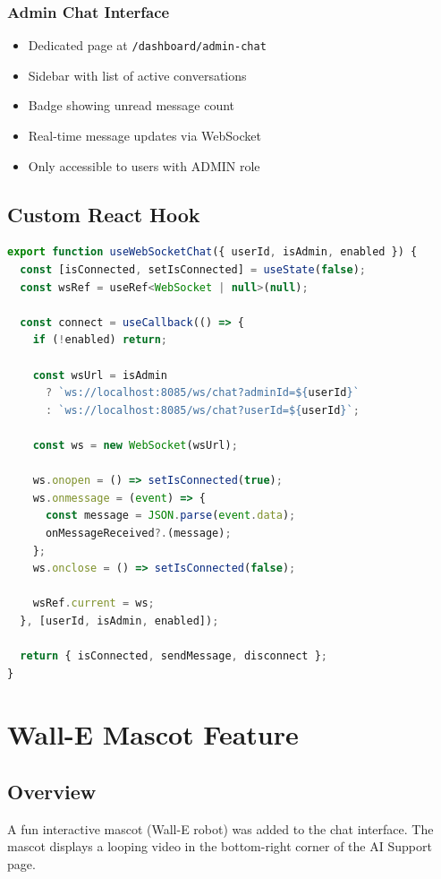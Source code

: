 \documentclass[12pt,a4paper]{article}
\begin{document}
\subsubsection{Admin Chat Interface}
\begin{itemize}
    \item Dedicated page at \texttt{/dashboard/admin-chat}
    \item Sidebar with list of active conversations
    \item Badge showing unread message count
    \item Real-time message updates via WebSocket
    \item Only accessible to users with ADMIN role
\end{itemize}

\subsection{Custom React Hook}
\begin{lstlisting}[language=JavaScript, caption=useWebSocketChat.ts]
export function useWebSocketChat({ userId, isAdmin, enabled }) {
  const [isConnected, setIsConnected] = useState(false);
  const wsRef = useRef<WebSocket | null>(null);
  
  const connect = useCallback(() => {
    if (!enabled) return;
    
    const wsUrl = isAdmin
      ? `ws://localhost:8085/ws/chat?adminId=${userId}`
      : `ws://localhost:8085/ws/chat?userId=${userId}`;
    
    const ws = new WebSocket(wsUrl);
    
    ws.onopen = () => setIsConnected(true);
    ws.onmessage = (event) => {
      const message = JSON.parse(event.data);
      onMessageReceived?.(message);
    };
    ws.onclose = () => setIsConnected(false);
    
    wsRef.current = ws;
  }, [userId, isAdmin, enabled]);
  
  return { isConnected, sendMessage, disconnect };
}
\end{lstlisting}

\section{Wall-E Mascot Feature}

\subsection{Overview}
A fun interactive mascot (Wall-E robot) was added to the chat interface. The mascot displays a looping video in the bottom-right corner of the AI Support page.
\end{document}
